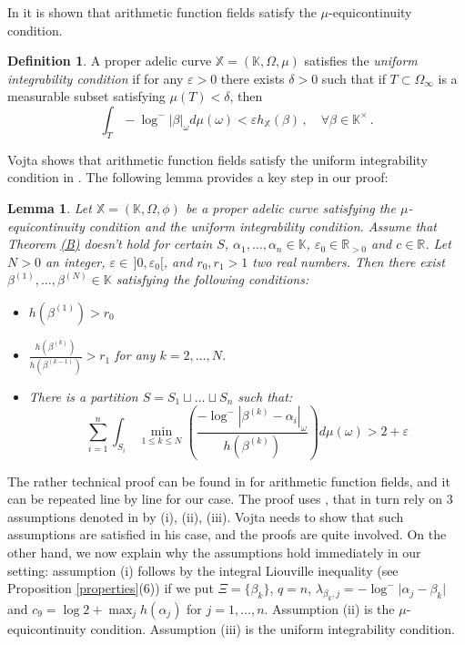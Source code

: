 \documentclass[10 pt,a4paper]{article}
\theoremstyle{plain}
\newtheorem{lem}[thm]{Lemma}
\theoremstyle{definition}
\newtheorem{defn}[thm]{Definition}
\theoremstyle{named}
\newcommand\bref[3][blue]{%
    \begingroup%
    \hypersetup{linkcolor=#1}%
    \hyperlink{#2}{#3}%
    \endgroup}
\begin{document}
In \cite[Proposition 8.9]{vo} it is shown that  arithmetic function fields satisfy the $\mu$-equicontinuity condition. 





\begin{defn}\label{un_int}
A proper adelic curve $\mathbb X=(\mathbb K,\Omega, \mu)$ satisfies the \emph{uniform integrability condition} if for  any $\varepsilon>0$ there exists $\delta>0$ such that if $T\subset\Omega_{\infty}$ is a measurable subset satisfying $\mu(T)<\delta$, then 
$$\int_T -\log^-|\beta|_\omega d\mu(\omega)<\varepsilon h_{\mathbb X}(\beta)\,,\quad \forall\beta\in\mathbb K^\times\,.$$
\end{defn}

Vojta shows that arithmetic function fields satisfy the uniform integrability condition in \cite[Lemma 8.8]{vo}.  The following lemma provides a key step in our proof:
\begin{lem}\label{vo8.12}
Let $\mathbb X=(\mathbb K,\Omega, \phi)$ be a proper adelic curve satisfying the $\mu$-equicontinuity condition  and the uniform integrability condition. Assume that Theorem \bref{thm:main}{(B)} doesn't hold for certain $S$, $\alpha_1,\ldots,\alpha_n\in\mathbb K$, $\varepsilon_0\in\mathbb R_{>0}$ and $c\in\mathbb R$. Let $N>0$ an integer, $\varepsilon\in\,]0,\varepsilon_0[$, and $r_0,r_1 >1$ two real numbers. Then there exist $\beta^{(1)},\ldots,\beta^{(N)}\in\mathbb K$ satisfying the following conditions:
\begin{itemize}
\item[$(1)$] $h(\beta^{(1)})>r_0$ 
\item[$(2)$] $\frac{h(\beta^{(k)})}{h(\beta^{(k-1)})}>r_1$ for any $k=2,\ldots, N$.
\item[$(3)$] There is a partition $S=S_1\sqcup\ldots\sqcup S_n$ such that:
$$\sum^n_{i=1}\int_{S_i}\, \min_{1\le k\le N}\left(\frac{-\log^-|\beta^{(k)}-\alpha_i|_\omega}{h(\beta^{(k)})}\right )d\mu(\omega)>2+\varepsilon$$
\end{itemize}
\end{lem}
\proof
The rather technical  proof can be found in \cite[Proposition 8.12]{vo} for arithmetic function fields, and it can be repeated line by line for our case. The proof uses \cite[Lemmas 8.10, 8.11]{vo}, that in turn rely on $3$ assumptions denoted in \cite{vo} by (i), (ii), (iii). Vojta needs to show that such assumptions are satisfied in his case, and the proofs are quite involved. On the other hand, we now  explain why the assumptions hold immediately in our setting: assumption (i) follows by the integral Liouville inequality (see Proposition \ref{properties}(6)) if we put $\Xi=\{\beta_k\}$, $q=n$, $\lambda_{\beta_k,j}=-\log^-\vert\alpha_j-\beta_k\vert$ and  $c_9= \log 2+\max_j h(\alpha_j)$ for $j=1,\ldots, n$. Assumption (ii) is the $\mu$-equicontinuity condition. Assumption (iii) is the uniform integrability condition.
\end{document}
